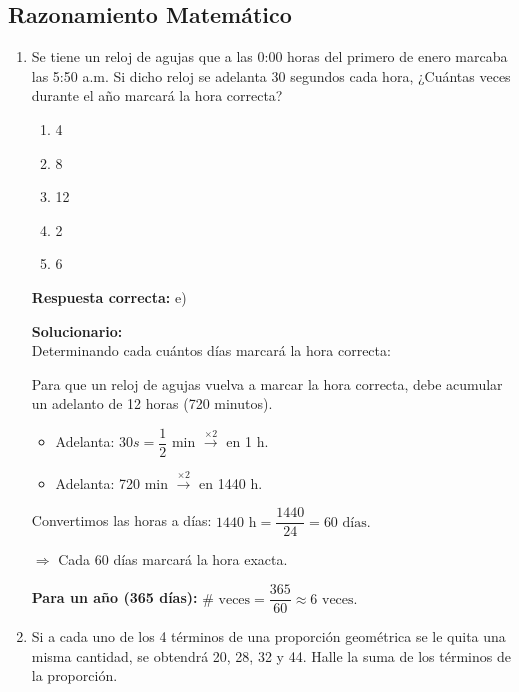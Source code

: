 \subsection*{Razonamiento Matemático}

\begin{enumerate}
	
	\item Se tiene un reloj de agujas que a las 0:00 horas del primero de enero marcaba las 5:50 a.m. Si dicho reloj se adelanta 30 segundos cada hora, ¿Cuántas veces durante el año marcará la hora correcta?
	
	\begin{enumerate}[label=\alph*)]
		\item 4
		\item 8 
		\item 12 
		\item 2
		\item 6
	\end{enumerate}
	
	\textbf{Respuesta correcta:} e)
	
	\vspace{2mm}
	\textbf{Solucionario:}\\
	Determinando cada cuántos días marcará la hora correcta:
	
	Para que un reloj de agujas vuelva a marcar la hora correcta, debe acumular un adelanto de 12 horas (720 minutos).
	
	\begin{itemize}
		\item Adelanta: $30s = \dfrac{1}{2}$ min $\xrightarrow{\times 2}$ en 1 h.
		\item Adelanta: 720 min $\xrightarrow{\times 2}$ en 1440 h.
	\end{itemize}
	
	Convertimos las horas a días:
	$1440 \text{ h} = \dfrac{1440}{24} = 60 \text{ días.}$
	
	$\Rightarrow$ Cada 60 días marcará la hora exacta.
	
	\vspace{2mm}
	\textbf{Para un año (365 días):}
	$\# \text{ veces} = \dfrac{365}{60} \approx 6 \text{ veces.}$
	
	\vspace{6mm}

	
	\item Si a cada uno de los 4 términos de una proporción geométrica se le quita una misma cantidad, se obtendrá 20, 28, 32 y 44. Halle la suma de los términos de la proporción.
	

\end{enumerate}
